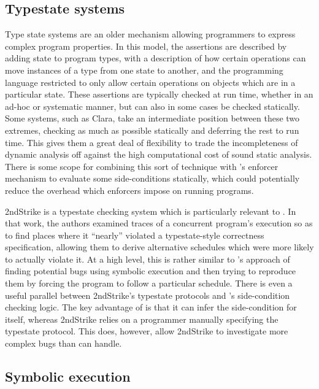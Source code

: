 \subsection{Typestate systems}

Type state systems\cite{Strom1986a} are an older mechanism allowing
programmers to express complex program properties.  In this model, the
assertions are described by adding state to program types, with a
description of how certain operations can move instances of a type
from one state to another, and the programming language restricted to
only allow certain operations on objects which are in a particular
state.  These assertions are typically checked at run
time\cite{Wolff2011}, whether in an
ad-hoc\cite[pages~305--314]{Gamma1995} or systematic\cite{Aldrich2009}
manner, but can also in some cases be checked
statically\cite{Lam2005}.  Some systems, such as
Clara\cite{Bodden2010}, take an intermediate position between these
two extremes, checking as much as possible statically and deferring
the rest to run time.  This gives them a great deal of flexibility to
trade the incompleteness of dynamic analysis off against the high
computational cost of sound static analysis.  There is some scope for
combining this sort of technique with {\technique}'s enforcer
mechanism to evaluate some side-conditions statically, which could
potentially reduce the overhead which enforcers impose on running
programs.

2ndStrike\cite{Gao2011} is a typestate checking system which is
particularly relevant to {\technique}.  In that work, the authors
examined traces of a concurrent program's execution so as to find
places where it ``nearly'' violated a typestate-style correctness
specification, allowing them to derive alternative schedules which
were more likely to actually violate it.  At a high level, this is
rather similar to {\technique}'s approach of finding potential bugs
using symbolic execution and then trying to reproduce them by forcing
the program to follow a particular schedule.  There is even a useful
parallel between 2ndStrike's typestate protocols and {\technique}'s
side-condition checking logic.  The key advantage of {\technique} is
that it can infer the side-condition for itself, whereas 2ndStrike
relies on a programmer manually specifying the typestate protocol.
This does, however, allow 2ndStrike to investigate more complex bugs
than {\technique} can handle.

\subsection{Symbolic execution}

